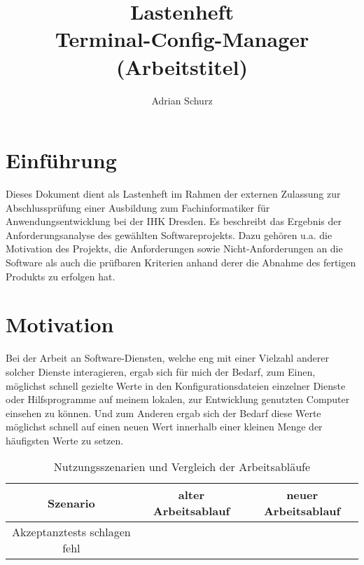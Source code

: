\documentclass[a4paper,11pt]{article}
\author{Adrian Schurz}
\title{Lastenheft\\[0.2em]\smaller{}Terminal-Config-Manager (Arbeitstitel)}
\begin{document}
\maketitle
{}
\newpage
{}
\tableofcontents

\section{Einführung}
Dieses Dokument dient als Lastenheft im Rahmen der externen Zulassung  zur Abschlussprüfung einer Ausbildung zum Fachinformatiker für Anwendungsentwicklung bei der IHK Dresden. Es beschreibt das Ergebnis der Anforderungsanalyse des gewählten Softwareprojekts. Dazu gehören u.a. die Motivation des Projekts, die Anforderungen sowie Nicht-Anforderungen an die Software als auch die prüfbaren Kriterien anhand derer die Abnahme des fertigen Produkts zu erfolgen hat.

\section{Motivation}
Bei der Arbeit an Software-Diensten, welche eng mit einer Vielzahl anderer solcher Dienste interagieren, ergab sich für mich der Bedarf, zum Einen, möglichst schnell gezielte Werte in den Konfigurationsdateien einzelner Dienste oder Hilfsprogramme auf meinem lokalen, zur Entwicklung genutzten Computer einsehen zu können. Und zum Anderen ergab sich der Bedarf diese Werte möglichst schnell auf einen neuen Wert innerhalb einer kleinen Menge der häufigsten Werte zu setzen.

\centering
\begin{table}[h]
\begin{tabular}{|c|c|c|}
	\hline
	Szenario & alter Arbeitsablauf & neuer Arbeitsablauf \\
	\hline
	Akzeptanztests schlagen fehl &  &  \\
	\hline
\end{tabular}
\caption{Nutzungsszenarien und Vergleich der Arbeitsabläufe}
\end{table}
\end{document}
